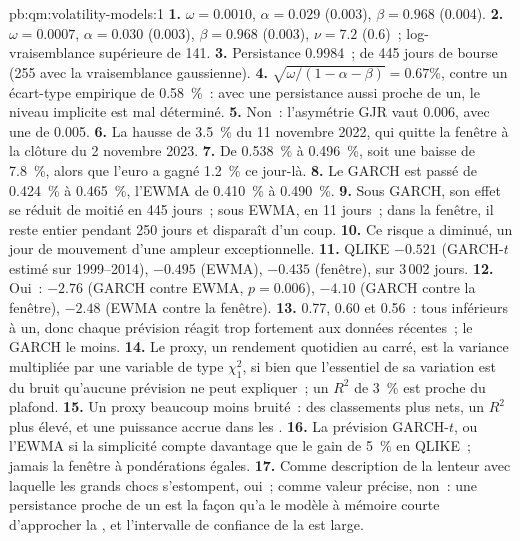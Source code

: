 \begin{solution}{pb:qm:volatility-models:1}
\textbf{1.} $\omega = 0.0010$, $\alpha = 0.029$ (0.003), $\beta = 0.968$ (0.004).
\textbf{2.} $\omega = 0.0007$, $\alpha = 0.030$ (0.003), $\beta = 0.968$ (0.003), $\nu = 7.2$ (0.6)~; log-vraisemblance supérieure de 141.
\textbf{3.} Persistance 0.9984~;  de 445 jours de bourse (255 avec la vraisemblance gaussienne).
\textbf{4.} $\sqrt{\omega/(1 - \alpha - \beta)} = 0.67\%$, contre un écart-type empirique de 0.58~\%~: avec une persistance aussi proche de un, le niveau implicite est mal
déterminé.
\textbf{5.} Non~: l'asymétrie GJR vaut 0.006, avec une  de 0.005.
\textbf{6.} La hausse de 3.5~\% du 11 novembre 2022, qui quitte la fenêtre à la clôture du 2 novembre 2023.
\textbf{7.} De 0.538~\% à 0.496~\%, soit une baisse de 7.8~\%, alors que l'euro a gagné 1.2~\% ce jour-là.
\textbf{8.} Le GARCH est passé de 0.424~\% à 0.465~\%, l'EWMA de 0.410~\% à 0.490~\%.
\textbf{9.} Sous GARCH, son effet se réduit de moitié en 445 jours~; sous EWMA, en 11 jours~; dans la fenêtre, il reste entier pendant 250 jours et disparaît d'un coup.
\textbf{10.} Ce risque a diminué, un jour de mouvement d'une ampleur exceptionnelle.
\textbf{11.} QLIKE $-0.521$ (GARCH-$t$ estimé sur 1999--2014), $-0.495$ (EWMA), $-0.435$ (fenêtre), sur 3\,002 jours.
\textbf{12.} Oui~:  $-2.76$ (GARCH contre EWMA, $p = 0.006$), $-4.10$ (GARCH contre la fenêtre), $-2.48$ (EWMA contre la fenêtre).
\textbf{13.} 0.77, 0.60 et 0.56~: tous inférieurs à un, donc chaque prévision réagit trop fortement aux données récentes~; le GARCH le moins.
\textbf{14.} Le proxy, un rendement quotidien au carré, est la variance multipliée par une variable de type $\chi^2_1$, si bien que l'essentiel de sa variation est du bruit qu'aucune prévision ne peut expliquer~; un $R^2$ de 3~\% est
proche du plafond.
\textbf{15.} Un proxy beaucoup moins bruité~: des classements plus nets, un $R^2$ plus élevé, et une puissance accrue dans les .
\textbf{16.} La prévision GARCH-$t$, ou l'EWMA si la simplicité compte davantage que le gain de 5~\% en QLIKE~; jamais la fenêtre à pondérations égales.
\textbf{17.} Comme description de la lenteur avec laquelle les grands chocs s'estompent, oui~; comme valeur précise, non~: une persistance proche de un est la façon qu'a le modèle à mémoire courte d'approcher
la , et l'intervalle de confiance de la  est large.

\end{solution}
